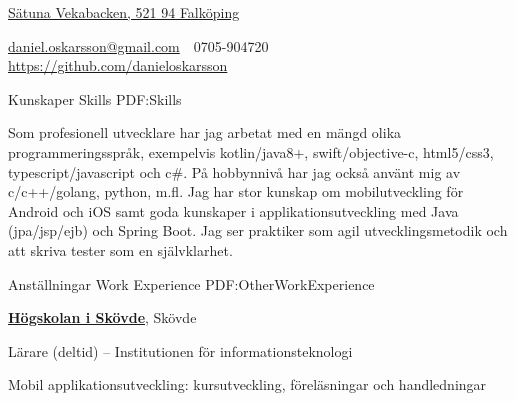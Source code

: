 \documentclass[letterpaper,MMMyyyy,nonstopmode]{resume}
\newcommand{\CVAuthor}{Daniel Oskarsson}
\newcommand{\CVWebpage}{https://github.com/danieloskarsson}
\begin{document}

\Title{\CVAuthor}

\begin{SubTitle}
\href{https://www.google.com/maps/place/VEKABACKEN,+521+94+Falk%C3%B6ping/@58.3358392,13.7009896,12z/data=!4m5!3m4!1s0x465ae469d63424bf:0xb367c493ed2f945c!8m2!3d58.2692871!4d13.5626312}
{Sätuna Vekabacken, 521 94 Falköping}
\par
\href{mailto:daniel.oskarsson@gmail.com}
{daniel.oskarsson@gmail.com}
\,\SubBulletSymbol\,
0705-904720
\\
\href{\CVWebpage}
{\url{\CVWebpage}}
\end{SubTitle}

\begin{Body}


\Section
{Kunskaper}
{Skills}
{PDF:Skills}

\Entry
Som profesionell utvecklare har jag arbetat med en mängd olika programmeringsspråk, exempelvis kotlin/java8+, swift/objective-c, html5/css3, typescript/javascript och c\#. På hobbynnivå har jag också använt mig av c/c++/golang, python, m.fl. Jag har stor kunskap om mobilutveckling för Android och iOS samt goda kunskaper i applikationsutveckling med Java (jpa/jsp/ejb) och Spring Boot. Jag ser praktiker som agil utvecklingsmetodik och att skriva tester som en självklarhet.


\Section
{Anställningar}
{Work Experience}
{PDF:OtherWorkExperience}

\Entry
\href{http://his.se}
{\textbf{Högskolan i Skövde}}, Skövde

\Gap
\BulletItem
Lärare (deltid)
\hfill
{} --
\newline
Institutionen för informationsteknologi
\begin{Detail}
\SubBulletItem
Mobil applikationsutveckling: kursutveckling, föreläsningar och handledningar
\end{Detail}

\begin{comment}
\Gap
\BulletItem
Studentmentor (deltid)
\hfill
\DatestampYMD{2018}{09}{01} --
\DatestampYMD{2019}{07}{01}
\newline
Avdelningen för utbildnings- och studentstöd
\begin{Detail}
\SubBulletItem
Särskilt efterfrågad av student som mentor
\end{Detail}


\end{comment}
\end{Body}
\end{document}
